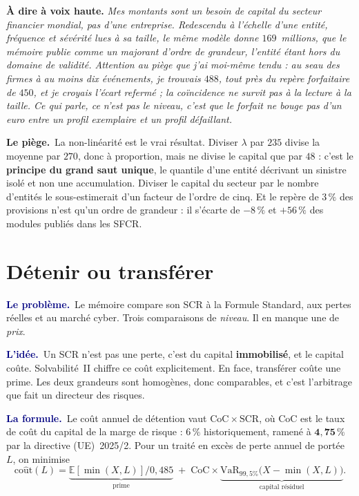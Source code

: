 \documentclass[11pt,a4paper]{article}
\providecommand{\E}{\mathbb{E}}
\newcommand{\lequoi}[1]{\smallskip\noindent\textcolor{navy}{\textbf{Le problème.}}\ #1\par}
\newcommand{\lidee}[1]{\smallskip\noindent\textcolor{navy}{\textbf{L'idée.}}\ #1\par}
\newcommand{\laformule}[1]{\smallskip\noindent\textcolor{navy}{\textbf{La formule.}}\ #1\par}
\newcommand{\lepiege}[1]{\smallskip\noindent\textcolor{accent}{\textbf{Le piège.}}\ #1\par}
\newcommand{\laphrase}[1]{\begin{phrasebox}\textbf{À dire à voix haute.} \emph{#1}\end{phrasebox}}
\begin{document}
\laphrase{Mes montants sont un besoin de capital du \emph{secteur financier mondial}, pas d'une
entreprise. Redescendu à l'échelle d'une entité, fréquence et sévérité lues à sa taille, le même
modèle donne $169$~millions, que le mémoire publie comme un majorant d'ordre de grandeur, l'entité
étant hors du domaine de validité. Attention au piège que j'ai moi-même tendu : au seau des firmes à
au moins dix événements, je trouvais $488$, tout près du repère forfaitaire de $450$, et je croyais
l'écart refermé ; la coïncidence ne survit pas à la lecture à la taille. Ce qui parle, ce n'est pas
le niveau, c'est que le forfait ne bouge pas d'un euro entre un profil exemplaire et un profil
défaillant.}

\lepiege{La non-linéarité est le vrai résultat. Diviser $\lambda$ par $235$ divise la moyenne par
$270$, donc à proportion, mais ne divise le capital que par $48$ : c'est le \textbf{principe du
grand saut unique}, le quantile d'une entité décrivant un sinistre isolé et non une accumulation.
Diviser le capital du secteur par le nombre d'entités le sous-estimerait d'un facteur de l'ordre de
cinq. Et le repère de $3\,\%$ des provisions n'est qu'un ordre de grandeur : il s'écarte de
$-8\,\%$ et $+56\,\%$ des modules publiés dans les SFCR.}

\section{Détenir ou transférer}

\lequoi{Le mémoire compare son SCR à la Formule Standard, aux pertes réelles et au marché
cyber. Trois comparaisons de \emph{niveau}. Il en manque une de \emph{prix}.}

\lidee{Un SCR n'est pas une perte, c'est du capital \textbf{immobilisé}, et le capital coûte.
Solvabilité~II chiffre ce coût explicitement. En face, transférer coûte une prime. Les deux
grandeurs sont homogènes, donc comparables, et c'est l'arbitrage que fait un directeur des
risques.}

\laformule{Le coût annuel de détention vaut $\mathrm{CoC}\times\mathrm{SCR}$, où
$\mathrm{CoC}$ est le taux de coût du capital de la marge de risque : $6\,\%$ historiquement,
ramené à $\mathbf{4{,}75\,\%}$ par la directive (UE)~2025/2. Pour un traité en excès de perte
annuel de portée $L$, on minimise
\[
  \mathrm{co\hat ut}(L)=\underbrace{\E[\min(X,L)]/0{,}485}_{\text{prime}}
  \;+\;\mathrm{CoC}\times\underbrace{\mathrm{VaR}_{99{,}5\%}\bigl(X-\min(X,L)\bigr)}_{\text{capital résiduel}} .
\]}
\end{document}
